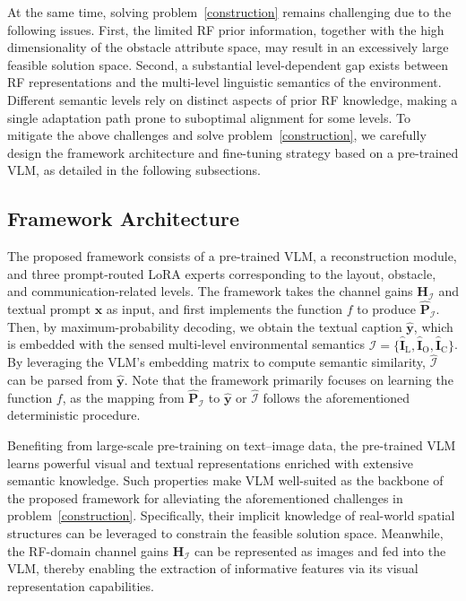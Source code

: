\documentclass[journal,12pt,onecolumn,draftclsnofoot]{IEEEtran}
\newcommand\IC{\ensuremath{\mathcal{I}}}
\newcommand\PB{\ensuremath{\bm{P}}}
\newcommand\xB{\ensuremath{\bm{x}}}
\newcommand\yB{\ensuremath{\bm{y}}}
\newcommand\HF{\ensuremath{\mathbf{H}}}
\newcommand\FIF{\ensuremath{\mathbf{I}}}
\newcommand\CR{\ensuremath{\mathrm{C}}}
\newcommand\LR{\ensuremath{\mathrm{L}}}
\newcommand\ROR{\ensuremath{\mathrm{O}}}
\newcommand{\wh}{\widehat}
\begin{document}
At the same time, solving problem~\eqref{construction} remains challenging due to the following issues. First, the limited RF prior information, together with the high dimensionality of the obstacle attribute space, may result in an excessively large feasible solution space. Second, a substantial level-dependent gap exists between RF representations and the multi-level linguistic semantics of the environment. Different semantic levels rely on distinct aspects of prior RF knowledge, making a single adaptation path prone to suboptimal alignment for some levels. To mitigate the above challenges and solve problem~\eqref{construction}, we carefully design the framework architecture and fine-tuning strategy based on a pre-trained VLM, as detailed in the following subsections.

\subsection{Framework Architecture}

The proposed framework consists of a pre-trained VLM, a reconstruction module, and three prompt-routed LoRA experts corresponding to the layout, obstacle, and communication-related levels. The framework takes the channel gains $\HF_{\IC}$ and textual prompt $\xB$ as input, and first implements the function $f$ to produce $\wh{\PB}_{\IC}$. Then, by maximum-probability decoding, we obtain the textual caption $\wh{\yB}$, which is embedded with the sensed multi-level environmental semantics $\wh{\IC}=\{\wh{\FIF}_{\LR},\wh{\FIF}_{\ROR},\wh{\FIF}_{\CR}\}$. By leveraging the VLM’s  embedding matrix to compute semantic similarity, $\wh{\IC}$ can be parsed from $\wh{\yB}$. Note that the framework primarily focuses on learning the function $f$, as the mapping from $\wh{\PB}_{\IC}$ to $\wh{\yB}$ or $\wh{\IC}$ follows the aforementioned deterministic procedure.


Benefiting from large-scale pre-training on text–image data, the pre-trained VLM learns powerful visual and textual representations enriched with extensive semantic knowledge. Such properties make VLM well-suited as the backbone of the proposed framework for alleviating the aforementioned challenges in problem~\eqref{construction}. Specifically, their implicit knowledge of real-world spatial structures can be leveraged to constrain the feasible solution space. Meanwhile, the RF-domain channel gains $\HF_{\IC}$ can be represented as images and fed into the VLM, thereby enabling the extraction of informative features via its visual representation capabilities.
\end{document}
